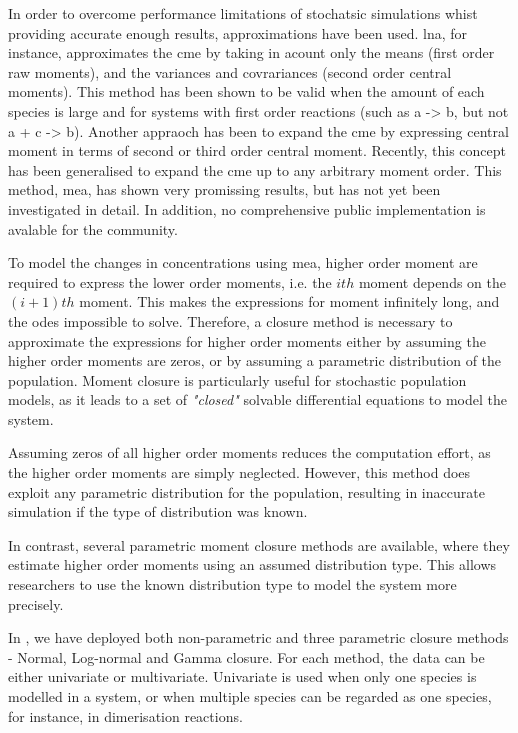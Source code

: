 In order to overcome performance limitations of stochatsic simulations whist providing accurate enough results, approximations have been used.
\Gls{lna}, for instance, approximates the 
\gls{cme}
by taking in acount only the means (first order raw moments), and the variances and covrariances (second order central moments).
This method has been shown to be valid when the amount of each species is large and for systems with first order reactions (such as  a -> b, but not a + c  -> b).
Another appraoch has been to expand the \gls{cme} by expressing central moment in terms of second or third order central moment.
Recently, this concept has been generalised to expand the \gls{cme} up to any arbitrary moment order.
\cite{ale_general_2013}
This method, \gls{mea}, has shown very promissing results, but has not yet been investigated in detail. 
In addition, no comprehensive public implementation is avalable for the community. 





To model the changes in concentrations using \gls{mea}, higher order moment are required to express the lower order moments, i.e. the $ith$ moment depends on the $(i+1)th$ moment. 
This makes the expressions for moment infinitely long, and the \glspl{ode} impossible to solve. 
Therefore, a closure method is necessary to approximate the expressions for higher order moments either by assuming the higher order moments are zeros, or by assuming a parametric distribution of the population. 
Moment closure is particularly useful for stochastic population models, as it leads to a set of \emph{"closed"} solvable differential equations to model the system. 


Assuming zeros of all higher order moments reduces the computation effort, as the higher order moments are simply neglected.
However, this method does exploit any parametric distribution for the population, resulting in inaccurate simulation if the type of distribution was known. 

In contrast, several parametric moment closure methods are available, where they estimate higher order moments using an assumed distribution type.
This allows researchers to use the known distribution type to model the system more precisely. 

In \means, we have deployed both non-parametric and three parametric closure methods - Normal, Log-normal and Gamma closure.
For each method, the data can be either univariate or multivariate. 
Univariate is used when only one species is modelled in a system, or when multiple species can be regarded as one species, for instance, in dimerisation reactions. 

